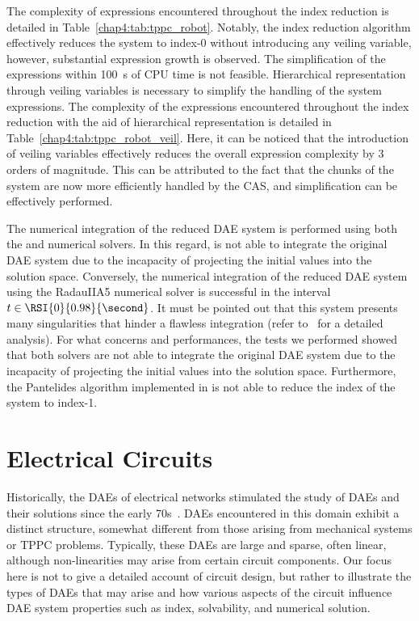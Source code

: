 The complexity of expressions encountered throughout the index reduction is detailed in Table~\ref{chap4:tab:tppc_robot}. Notably, the index reduction algorithm effectively reduces the system to index-0 without introducing any veiling variable, however, substantial expression growth is observed. The simplification of the expressions within \SI{100}{\second} of \ac{CPU} time is not feasible. Hierarchical representation through veiling variables is necessary to simplify the handling of the system expressions. The complexity of the expressions encountered throughout the index reduction with the aid of hierarchical representation is detailed in Table~\ref{chap4:tab:tppc_robot_veil}. Here, it can be noticed that the introduction of veiling variables effectively reduces the overall expression complexity by 3 orders of magnitude. This can be attributed to the fact that the chunks of the system are now more efficiently handled by the \ac{CAS}, and simplification can be effectively performed.

The numerical integration of the reduced \ac{DAE} system is performed using both the \Maple{} and \Indigo{} numerical solvers. In this regard, \Maple{} is not able to integrate the original \ac{DAE} system due to the incapacity of projecting the initial values into the solution space. Conversely, the numerical integration of the reduced \ac{DAE} system using the RadauIIA5 \Indigo{} numerical solver is successful in the interval $t \in \RSI{0}{0.98}{\second}$. It must be pointed out that this system presents many singularities that hinder a flawless integration (refer to~\cite{schwarz2020singularities} for a detailed analysis). For what concerns \Mathematica{} and \Matlab{} performances, the tests we performed showed that both solvers are not able to integrate the original \ac{DAE} system due to the incapacity of projecting the initial values into the solution space. Furthermore, the Pantelides algorithm implemented in \Matlab{} is not able to reduce the index of the system to index-1.

\section{Electrical Circuits}
\label{chap4:sec:electrical_circuits}

Historically, the \acp{DAE} of electrical networks stimulated the study of \acp{DAE} and their solutions since the early 70s~\cite{gear1971simultaneous}. \acp{DAE} encountered in this domain exhibit a distinct structure, somewhat different from those arising from mechanical systems or \ac{TPPC} problems. Typically, these \acp{DAE} are large and sparse, often linear, although non-linearities may arise from certain circuit components. Our focus here is not to give a detailed account of circuit design, but rather to illustrate the types of \acp{DAE} that may arise and how various aspects of the circuit influence \ac{DAE} system properties such as index, solvability, and numerical solution.

